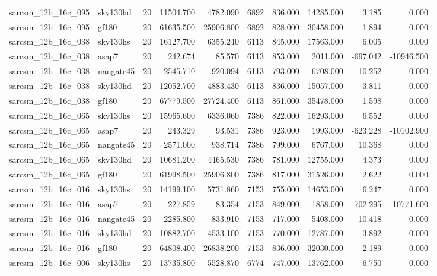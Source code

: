 \begin{longtable}{llrrrrrrrr}
sarcsm\_12b\_16c\_095 & sky130hd & 20 & 11504.700 & 4782.090 & 6892 & 836.000 & 14285.000 & 3.185 & 0.000 \\
sarcsm\_12b\_16c\_095 & gf180 & 20 & 61635.500 & 25906.800 & 6892 & 828.000 & 30458.000 & 1.894 & 0.000 \\
sarcsm\_12b\_16c\_038 & sky130hs & 20 & 16127.700 & 6355.240 & 6113 & 845.000 & 17563.000 & 6.005 & 0.000 \\
sarcsm\_12b\_16c\_038 & asap7 & 20 & 242.674 & 85.570 & 6113 & 853.000 & 2011.000 & -697.042 & -10946.500 \\
sarcsm\_12b\_16c\_038 & nangate45 & 20 & 2545.710 & 920.094 & 6113 & 793.000 & 6708.000 & 10.252 & 0.000 \\
sarcsm\_12b\_16c\_038 & sky130hd & 20 & 12052.700 & 4883.430 & 6113 & 836.000 & 15057.000 & 3.811 & 0.000 \\
sarcsm\_12b\_16c\_038 & gf180 & 20 & 67779.500 & 27724.400 & 6113 & 861.000 & 35478.000 & 1.598 & 0.000 \\
sarcsm\_12b\_16c\_065 & sky130hs & 20 & 15965.600 & 6336.060 & 7386 & 822.000 & 16293.000 & 6.552 & 0.000 \\
sarcsm\_12b\_16c\_065 & asap7 & 20 & 243.329 & 93.531 & 7386 & 923.000 & 1993.000 & -623.228 & -10102.900 \\
sarcsm\_12b\_16c\_065 & nangate45 & 20 & 2571.000 & 938.714 & 7386 & 799.000 & 6767.000 & 10.368 & 0.000 \\
sarcsm\_12b\_16c\_065 & sky130hd & 20 & 10681.200 & 4465.530 & 7386 & 781.000 & 12755.000 & 4.373 & 0.000 \\
sarcsm\_12b\_16c\_065 & gf180 & 20 & 61998.500 & 25906.800 & 7386 & 817.000 & 31526.000 & 2.622 & 0.000 \\
sarcsm\_12b\_16c\_016 & sky130hs & 20 & 14199.100 & 5731.860 & 7153 & 755.000 & 14653.000 & 6.247 & 0.000 \\
sarcsm\_12b\_16c\_016 & asap7 & 20 & 227.859 & 83.354 & 7153 & 849.000 & 1858.000 & -702.295 & -10771.600 \\
sarcsm\_12b\_16c\_016 & nangate45 & 20 & 2285.800 & 833.910 & 7153 & 717.000 & 5408.000 & 10.418 & 0.000 \\
sarcsm\_12b\_16c\_016 & sky130hd & 20 & 10882.700 & 4533.100 & 7153 & 770.000 & 12787.000 & 3.892 & 0.000 \\
sarcsm\_12b\_16c\_016 & gf180 & 20 & 64808.400 & 26838.200 & 7153 & 836.000 & 32030.000 & 2.189 & 0.000 \\
sarcsm\_12b\_16c\_006 & sky130hs & 20 & 13735.800 & 5528.870 & 6774 & 747.000 & 13762.000 & 6.750 & 0.000 \\

\end{longtable}
